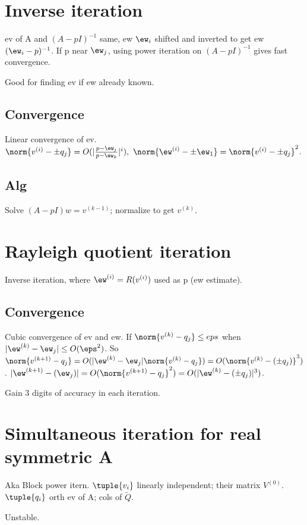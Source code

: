 \documentclass[oneside, article]{memoir}
\begin{document}
\section{Inverse iteration}
ev of A and $(A-pI)^{-1}$ same, ew $\ew_{i}$ shifted and inverted to get ew $(\ew_{i} - p)^{-1}$. If p near $\ew_{j}$, using power iteration on $(A-pI)^{-1}$ gives fast convergence.

Good for finding ev if ew already known.

\subsection{Convergence}
Linear convergence of ev. \\
$\norm{v^{(i)} - \pm q_{j}} = O(|\frac{p-\ew_{j}}{p-\ew_{k}}|^{i}),\ \norm{\ew^{(i)} - \pm \ew_{1}} = \norm{v^{(i)} - \pm q_{j}}^{2}$.

\subsection{Alg}
Solve $(A-pI)w = v^{(k-1)}$; normalize to get $v^{(k)}$.

\section{Rayleigh quotient iteration}
Inverse iteration, where $\ew^{(i)} = R(v^{(i)})$ used as p (ew estimate).

\subsection{Convergence}
Cubic convergence of ev and ew. If $\norm{v^{(k)} - q_{j}} \leq eps$ when $|\ew^{(k)} - \ew_{j}| \leq O(\eps^{2})$. So $\norm{v^{(k+1)} - q_{j}} = O(|\ew^{(k)} - \ew_{j}|\norm{v^{(k)} - q_{j}}) =\\ O(\norm{v^{(k)} - (\pm q_{j})}^{3})$. $|\ew^{(k+1)} - (\ew_{j})| = O(\norm{v^{(k+1)} - q_{j}}^{2}) = O(|\ew^{(k)} - (\pm q_{j})|^{3})$.

Gain 3 digits of accuracy in each iteration.

\section{Simultaneous iteration for real symmetric A}
Aka Block power itern. $\tuple{v_{i}}$ linearly independent; their matrix $V^{(0)}$. $\tuple{q_{i}}$ orth ev of A; cols of $\tilde{Q}$.

Unstable. \why
\end{document}
